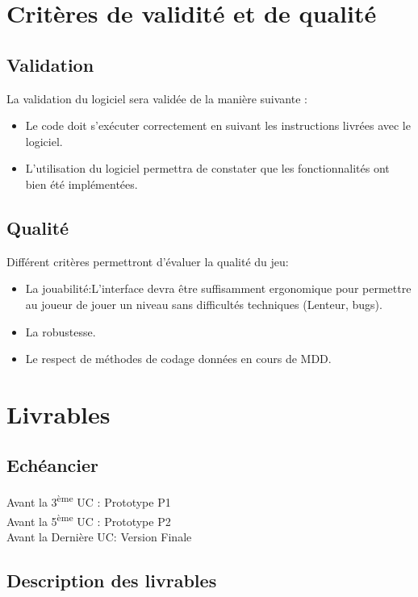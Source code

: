 \documentclass[a4paper,11pt]{article}
\begin{document}
\section{Critères de validité et de qualité}

\subsection{Validation}


La validation du logiciel sera validée de la manière suivante :\\
\begin{itemize}[label = $\bullet$]
	\item Le code doit s’exécuter correctement en suivant les instructions livrées avec le logiciel.
	\item L'utilisation du logiciel permettra de constater que les fonctionnalités ont bien été implémentées.
\end{itemize}

\subsection{Qualité}


Différent critères permettront d'évaluer la qualité du jeu:\\
\begin{itemize}[label = $\bullet$]
	\item La jouabilité:L'interface devra être suffisamment ergonomique pour permettre au joueur de jouer un niveau sans difficultés techniques (Lenteur, bugs).
	\item La robustesse.
	\item Le respect de méthodes de codage données en cours de MDD.
\end{itemize}

\section{Livrables} 

\subsection{Echéancier}

\noindent
Avant la 3\textsuperscript{ème} UC : Prototype P1 \\
Avant la 5\textsuperscript{ème} UC : Prototype P2 \\
Avant la Dernière UC: Version Finale 
\subsection{Description des livrables}
\end{document}
